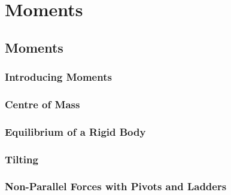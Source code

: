 \documentclass[../alevelmaths.tex]{subfiles}
\begin{document}
\chapter{Moments}
\section{Moments}
\subsection*{Introducing Moments}
\subsection*{Centre of Mass}
\subsection*{Equilibrium of a Rigid Body}
\subsection*{Tilting}
\subsection*{Non-Parallel Forces with Pivots and Ladders}
\end{document}
